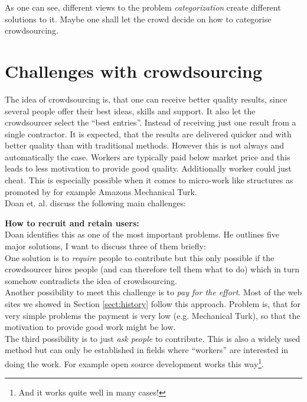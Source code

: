 \documentclass{acm_proc_article-sp}
\begin{document}
  As one can see, different views to the problem \textit{categorization} create different solutions to it. Maybe one shall let the crowd decide on how to categorise crowdsourcing.

  \section{Challenges with crowdsourcing}
  \label{sect:problems}
  The idea of crowdsourcing is, that one can receive better quality results, since several people offer their best ideas, skills and support. It also let the crowdsourcer select the ``best entries''. Instead of receiving just one result from a single contractor. It is expected, that the results are delivered quicker and with better quality than with traditional methods. However this is not always and automatically the case. Workers are typically paid below market price and this leads to less motivation to provide good quality. Additionally worker could just cheat. This is especially possible when it comes to micro-work like structures as promoted by for example Amazons Mechanical Turk.\\
  Doan et. al. discuss the following main challenges\cite{doan:crowd}:

  \textbf{How to recruit and retain users: }\\
  Doan identifies this as one of the most important problems. He outlines five major solutions, I want to discuss three of them briefly:\\
  One solution is to \textit{require} people to contribute but this only possible if the crowdsourcer hires people (and can therefore tell them what to do) which in turn somehow contradicts the idea of crowdsourcing.\\
  Another possibility to meet this challenge is to \textit{pay for the effort}. Most of the web sites we showed in Section \ref{sect:history} follow this approach. Problem is, that for very simple problems the payment is very low (e.g. Mechanical Turk), so that the motivation to provide good work might be low.\\
  The third possibility is to just \textit{ask people} to contribute. This is also a widely used method but can only be established in fields where ``workers'' are interested in doing the work. For example open source development works this way\footnote{And it works quite well in many cases!}.
\end{document}

